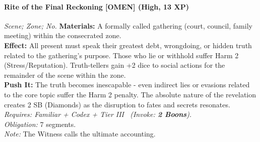 \paragraph{Rite of the Final Reckoning [OMEN] (High, 13 XP)} \emph{Scene; Zone; No.}
\textbf{Materials:} A formally called gathering (court, council, family meeting) within the consecrated zone. \\
\textbf{Effect:} All present must speak their greatest debt, wrongdoing, or hidden truth related to the gathering's purpose. Those who lie or withhold suffer Harm 2 (Stress/Reputation). Truth-tellers gain +2 dice to social actions for the remainder of the scene within the zone. \\
\textbf{Push It:} The truth becomes inescapable - even indirect lies or evasions related to the core topic suffer the Harm 2 penalty. The absolute nature of the revelation creates 2 SB (Diamonds) as the disruption to fates and secrets resonates. \\
\emph{Requires: Familiar + Codex + Tier III \ (\textit{Invoke:} \textbf{2 Boons}).} \\
\emph{Obligation:} 7 segments. \\
\emph{Note:} The Witness calls the ultimate accounting. %
